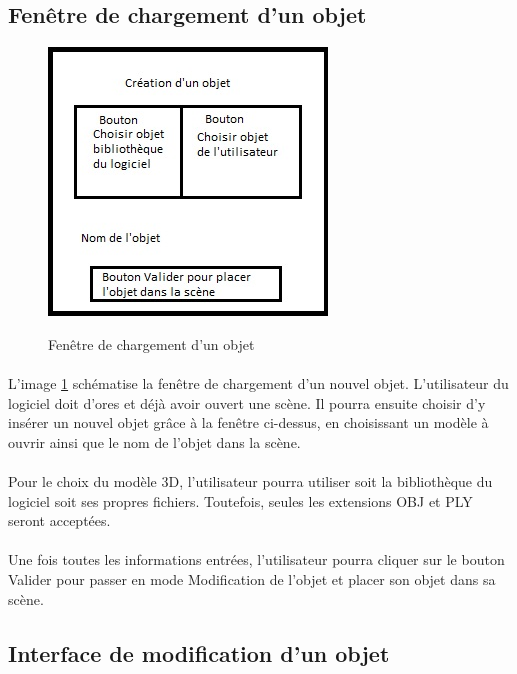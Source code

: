 \subsection{Fenêtre de chargement d'un objet}

\begin{figure}[h]
  \centering
  \includegraphics{chargement}
  \label{fig:chargement}
  \caption{Fenêtre de chargement d'un objet}
\end{figure}

\paragraph{}
L'image \ref{fig:chargement} schématise la fenêtre de chargement d’un nouvel objet. L’utilisateur du logiciel doit d’ores et déjà avoir ouvert une scène. Il pourra ensuite choisir d’y insérer un nouvel objet grâce à la fenêtre ci-dessus, en choisissant un modèle à ouvrir ainsi que le nom de l’objet dans la scène.

\paragraph{}
Pour le choix du modèle 3D, l’utilisateur pourra utiliser soit la bibliothèque du logiciel soit ses propres fichiers. Toutefois, seules les extensions OBJ et PLY seront acceptées.

\paragraph{}
Une fois toutes les informations entrées, l’utilisateur pourra cliquer sur le bouton Valider pour passer en mode Modification de l’objet et placer son objet dans sa scène.

\newpage

\subsection{Interface de modification d'un objet}



